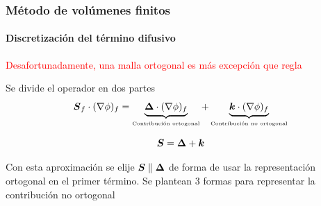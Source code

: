 

\begin{frame}
    \frametitle{M\'etodo de vol\'umenes finitos}
    \framesubtitle{Discretizaci\'on del t\'ermino difusivo}

    \begin{center}
      \textcolor{red}{Desafortunadamente, una malla ortogonal es m\'as excepci\'on que regla}
    \end{center}
    
    Se divide el operador en dos partes
    $$ \boldsymbol{S}_f \cdot (\nabla \phi)_f = \underbrace{\boldsymbol{\Delta} \cdot (\nabla \phi)_f}_{\mbox{\tiny Contribuci\'on ortogonal}} + \underbrace{\boldsymbol{k} \cdot (\nabla \phi)_f}_{\mbox{\tiny Contribuci\'on no ortogonal}} $$

    $$ \boldsymbol{S} = \boldsymbol{\Delta} + \boldsymbol{k} $$

    Con esta aproximaci\'on se elije $\boldsymbol{S} \parallel \boldsymbol{\Delta}$ de forma de usar la representaci\'on ortogonal en el primer t\'ermino. Se plantean 3 formas para representar la contribuci\'on no ortogonal

\end{frame}








